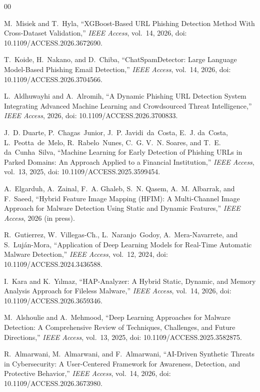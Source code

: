\documentclass[conference]{IEEEtran}
\begin{document}
\label{sec:related_work}

\begin{thebibliography}{00}

M.~Misiek and T.~Hyla, ``XGBoost-Based URL Phishing Detection Method With Cross-Dataset Validation,'' \emph{IEEE Access}, vol.~14, 2026, doi: 10.1109/ACCESS.2026.3672690.

T.~Koide, H.~Nakano, and D.~Chiba, ``ChatSpamDetector: Large Language Model-Based Phishing Email Detection,'' \emph{IEEE Access}, vol.~14, 2026, doi: 10.1109/ACCESS.2026.3704566.

L.~Aldhuwayhi and A.~Alromih, ``A Dynamic Phishing URL Detection System Integrating Advanced Machine Learning and Crowdsourced Threat Intelligence,'' \emph{IEEE Access}, 2026, doi: 10.1109/ACCESS.2026.3700833.

J.~D. Duarte, P.~Chagas~Junior, J.~P. Javidi~da~Costa, E.~J. da~Costa, L.~Peotta~de~Melo, R.~Rabelo~Nunes, C.~G. V.~N. Soares, and T.~E. da~Cunha~Silva, ``Machine Learning for Early Detection of Phishing URLs in Parked Domains: An Approach Applied to a Financial Institution,'' \emph{IEEE Access}, vol.~13, 2025, doi: 10.1109/ACCESS.2025.3599454.

A.~Elgarduh, A.~Zainal, F.~A. Ghaleb, S.~N. Qasem, A.~M. Albarrak, and F.~Saeed, ``Hybrid Feature Image Mapping (HFIM): A Multi-Channel Image Approach for Malware Detection Using Static and Dynamic Features,'' \emph{IEEE Access}, 2026 (in press).

R.~Gutierrez, W.~Villegas-Ch., L.~Naranjo~Godoy, A.~Mera-Navarrete, and S.~Luj\'{a}n-Mora, ``Application of Deep Learning Models for Real-Time Automatic Malware Detection,'' \emph{IEEE Access}, vol.~12, 2024, doi: 10.1109/ACCESS.2024.3436588.

I.~Kara and K.~Y\i lmaz, ``HAP-Analyzer: A Hybrid Static, Dynamic, and Memory Analysis Approach for Fileless Malware,'' \emph{IEEE Access}, vol.~14, 2026, doi: 10.1109/ACCESS.2026.3659346.

M.~Alshoulie and A.~Mehmood, ``Deep Learning Approaches for Malware Detection: A Comprehensive Review of Techniques, Challenges, and Future Directions,'' \emph{IEEE Access}, vol.~13, 2025, doi: 10.1109/ACCESS.2025.3582875.

R.~Almarwani, M.~Almarwani, and F.~Almarwani, ``AI-Driven Synthetic Threats in Cybersecurity: A User-Centered Framework for Awareness, Detection, and Protective Behavior,'' \emph{IEEE Access}, vol.~14, 2026, doi: 10.1109/ACCESS.2026.3673980.


\end{thebibliography}
\end{document}
